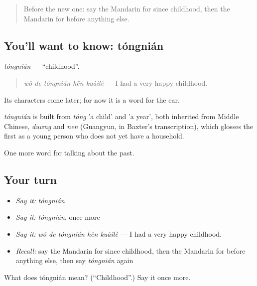 \begin{quote}
Before the new one: say the Mandarin for since childhood, then the Mandarin for before anything else.
\end{quote}

\subsection*{You'll want to know: tóngnián}
\emph{tóngnián} — \textquotedblleft{}childhood\textquotedblright{}.

\begin{quote}
\emph{wǒ de tóngnián hěn kuàilè} — I had a very happy childhood.
\end{quote}

Its characters come later; for now it is a word for the ear.

\begin{cousinweb}
\emph{tóngnián} is built from \emph{tóng} 'a child' and  'a year', both inherited from Middle Chinese, \emph{duwng} and \emph{nen} (Guangyun, in Baxter's transcription), which glosses the first as a young person who does not yet have a household.
\end{cousinweb}

\begin{grammarlens}[title={What you've built}]
One more word for talking about the past.
\end{grammarlens}

\subsection*{Your turn}
\begin{itemize}
\raggedright
  \item \emph{Say it:} \emph{tóngnián}
  \item \emph{Say it:} \emph{tóngnián}, once more
  \item \emph{Say it:} \emph{wǒ de tóngnián hěn kuàilè} — I had a very happy childhood.
  \item \emph{Recall:} say the Mandarin for since childhood, then the Mandarin for before anything else, then say \emph{tóngnián} again
\end{itemize}

\begin{tcolorbox}[breakable,colback=teal!4,colframe=teal!35!black,title={Before you move on}]
What does tóngnián mean? (\textquotedblleft{}Childhood\textquotedblright{}.) Say it once more.
\end{tcolorbox}
